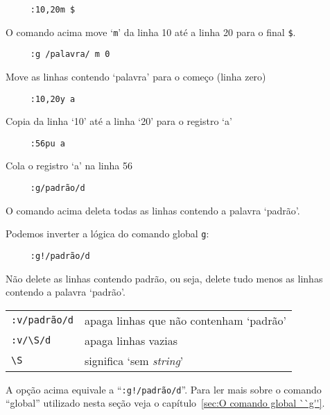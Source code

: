 \begin{verbatim}
     :10,20m $
\end{verbatim}

O comando acima move `{\tt m}' da linha 10 até a linha 20 para o final \verb|$|.

\begin{verbatim}
     :g /palavra/ m 0
\end{verbatim}

Move as linhas contendo `palavra' para o começo (linha zero)

\begin{verbatim}
     :10,20y a
\end{verbatim}

Copia da linha `10' até a linha `20' para o registro `a'

\begin{verbatim}
     :56pu a
\end{verbatim}

Cola o registro `a' na linha 56

\begin{verbatim}
     :g/padrão/d
\end{verbatim}

O comando acima deleta todas as linhas contendo a palavra `padrão'.

Podemos inverter a lógica do comando global \verb+g+:

\begin{verbatim}
     :g!/padrão/d
\end{verbatim}

Não delete as linhas contendo padrão, ou seja, delete tudo menos as linhas
contendo a palavra `padrão'. 

\begin{table}[htb]\begin{center} \begin{tabular}{ll} \hline
     \verb|:v/padrão/d| & apaga linhas que não contenham `padrão'\\
     \verb|:v/\S/d| & apaga linhas vazias\\
     \verb|\S| & significa `sem \textit{string}'\\
\hline \end{tabular}\end{center}\end{table}

A opção acima equivale a ``\verb+:g!/padrão/d+''.  Para ler mais sobre
o comando ``global'' utilizado nesta seção veja o capítulo~\ref{sec:O comando global ``g''}.

